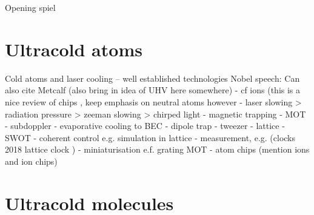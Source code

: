 
Opening spiel
\cite{Andre2006}

\section{Ultracold atoms}


Cold atoms and laser cooling -- well established technologies
Nobel speech: \cite{RevModPhys.70.721}
Can also cite Metcalf \cite{Metcalf1999}
(also bring in idea of UHV here somewhere)
- cf ions \cite{RevModPhys.62.531} (this is a nice review of chips \cite{Romaszko2020}, keep emphasis on neutral atoms however
- laser slowing
  > radiation pressure \cite{PhysRevLett.40.1639}
  > zeeman slowing \cite{PhysRevLett.48.596}
  > chirped light \cite{Prodan1984}
- magnetic trapping \cite{PhysRevLett.54.2596}
- MOT \cite{PhysRevLett.59.2631}
- subdoppler \cite{Dalibard:89}
- evaporative cooling to BEC \cite{Anderson198}
- dipole trap \cite{Chu1986}
- tweezer \cite{Schlosser2001}
- lattice \cite{PhysRevLett.81.3108}
- SWOT \cite{Wu2017}
- coherent control e.g. simulation in lattice \cite{Schäfer2020}
- measurement, e.g. (clocks 2018 lattice clock \cite{PhysRevX.8.021036})
- miniaturisation e.f. grating MOT \cite{Nshii2013}
- atom chips (mention ions and ion chips)

\section{Ultracold molecules}


